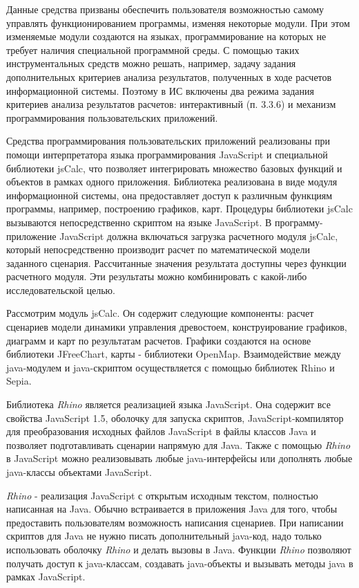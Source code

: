 \documentclass{article}
\begin{document}
Данные средства призваны обеспечить пользователя 
возможностью самому управлять функционированием 
программы, изменяя некоторые  модули. При этом 
изменяемые модули создаются на языках, программирование 
на которых не требует наличия специальной программной 
среды. С помощью таких инструментальных средств 
можно решать, например, задачу задания дополнительных 
критериев анализа результатов, полученных 
в ходе расчетов информационной системы. Поэтому 
в ИС включены два режима задания критериев 
анализа результатов расчетов: интерактивный 
(п. 3.3.6) и механизм программирования пользовательских 
приложений.\label{OLEHLINK8}\label{OLEHLINK9}

Средства программирования пользовательских 
приложений реализованы при помощи интерпретатора 
языка программирования JavaScript и специальной 
библиотеки jsCalc, что позволяет интегрировать 
множество базовых функций и объектов в рамках 
одного приложения. Библиотека реализована 
в виде модуля информационной системы, она предоставляет 
доступ к различным функциям программы, например, 
построению графиков, карт. Процедуры  библиотеки 
jsCalc  вызываются непосредственно скриптом на 
языке JavaScript. В программу-приложение JavaScript должна 
включаться загрузка расчетного модуля jsCalc, 
который непосредственно производит расчет 
по математической модели заданного сценария. 
Рассчитанные значения результата доступны 
через функции расчетного модуля. Эти результаты 
можно комбинировать с какой-либо исследовательской 
целью. 

Рассмотрим модуль jsCalc. Он содержит следующие 
компоненты: расчет сценариев модели динамики 
управления древостоем, конструирование графиков, 
 диаграмм и карт по результатам расчетов. Графики 
создаются на основе библиотеки JFreeChart, карты 
- библиотеки OpenMap. Взаимодействие между java-модулем 
и java-скриптом осуществляется с помощью библиотек 
Rhino и Sepia.

Библиотека \label{OLEHLINK3}\textit{Rhino} является реализацией 
языка JavaScript. Она содержит все свойства JavaScript 
1.5, оболочку для запуска скриптов, JavaScript-компилятор 
для преобразования исходных файлов \label{OLEHLINK1}JavaScript 
в файлы классов Java и позволяет подготавливать 
сценарии напрямую для Java. Также с помощью \textit{Rhino} 
в JavaScript можно реализовывать любые java-интерфейсы 
или дополнять любые java-классы объектами JavaScript.

\textit{Rhino} - реализация JavaScript с открытым исходным 
текстом, полностью написанная на Java. Обычно 
встраивается в приложения Java для того, чтобы 
предоставить пользователям возможность написания 
сценариев. При написании скриптов для Java не 
нужно писать дополнительный java-код, надо только 
использовать оболочку \textit{Rhino} и делать вызовы 
в Java. Функции \textit{Rhino} позволяют получать доступ 
к java-классам, создавать java-объекты и вызывать 
методы java в рамках JavaScript.
\end{document}
